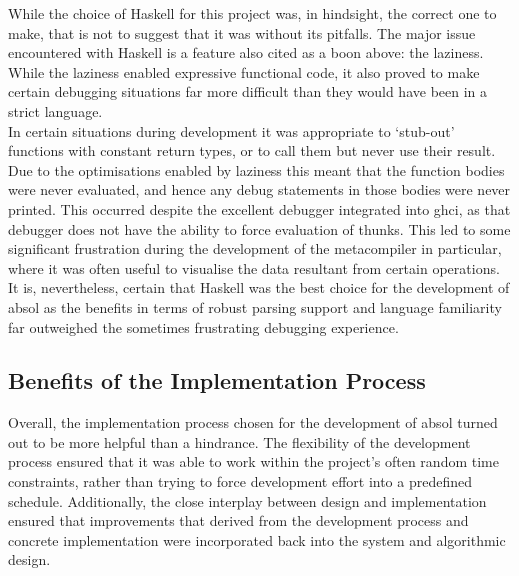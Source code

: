 While the choice of Haskell for this project was, in hindsight, the correct one to make, that is not to suggest that it was without its pitfalls.
The major issue encountered with Haskell is a feature also cited as a boon above: the laziness. 
While the laziness enabled expressive functional code, it also proved to make certain debugging situations far more difficult than they would have been in a strict language.\\

In certain situations during development it was appropriate to `stub-out' functions with constant return types, or to call them but never use their result.
Due to the optimisations enabled by laziness this meant that the function bodies were never evaluated, and hence any debug statements in those bodies were never printed. 
This occurred despite the excellent debugger integrated into \gls{ghci}, as that debugger does not have the ability to force evaluation of thunks.
This led to some significant frustration during the development of the metacompiler in particular, where it was often useful to visualise the data resultant from certain operations. \\

It is, nevertheless, certain that Haskell was the best choice for the development of \gls{absol} as the benefits in terms of robust parsing support and language familiarity far outweighed the sometimes frustrating debugging experience. 



\subsection{Benefits of the Implementation Process} %
\label{sub:benefits_of_the_implementation_process}
Overall, the implementation process chosen for the development of \gls{absol} turned out to be more helpful than a hindrance. 
The flexibility of the development process ensured that it was able to work within the project's often random time constraints, rather than trying to force development effort into a predefined schedule.
Additionally, the close interplay between design and implementation ensured that improvements that derived from the development process and concrete implementation were incorporated back into the system and algorithmic design. \\

